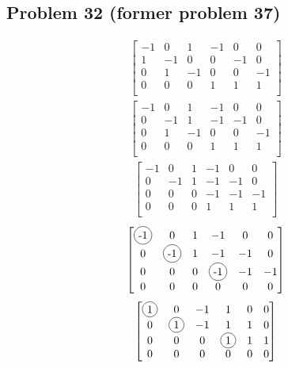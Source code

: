 \documentclass[a4paper,11pt]{article}
\newcommand*\circled[1]{\tikz[baseline=(char.base)]{
             \node[shape=circle,draw,inner sep=2pt] (char) {#1};}}
\begin{document}
\subsection*{Problem 32 (former problem 37)} 
\begin{align}
\begin{bmatrix}
-1 & 0  & 1  & -1 & 0  & 0  \\
1  & -1 & 0  & 0  & -1 & 0  \\
0  & 1  & -1 & 0  & 0  & -1 \\
0  & 0  & 0  & 1  & 1  & 1  \\
\end{bmatrix}
\end{align}
\begin{align}
\begin{bmatrix}
-1 & 0  & 1  & -1 & 0  & 0  \\
0  & -1 & 1  & -1 & -1 & 0  \\
0  & 1  & -1 & 0  & 0  & -1 \\
0  & 0  & 0  & 1  & 1  & 1  \\
\end{bmatrix}
\end{align}
\begin{align}
\begin{bmatrix}
-1 & 0  & 1  & -1 & 0  & 0  \\
0  & -1 & 1  & -1 & -1 & 0  \\
0  & 0  & 0  & -1 & -1 & -1 \\
0  & 0  & 0  & 1  & 1  & 1  \\
\end{bmatrix}
\end{align}
\begin{align}
\begin{bmatrix}
\circled{-1} &           0  & 1  &           -1 &  0 &  0 \\
0            & \circled{-1} & 1  &           -1 & -1 &  0 \\
0            &           0  & 0  & \circled{-1} & -1 & -1 \\
0            &           0  & 0  &            0 &  0 &  0 \\
\end{bmatrix}
\end{align}
\begin{align}
\begin{bmatrix}
\circled{ 1} &           0  & -1  &            1 &  0 &  0 \\
0            & \circled{ 1} & -1  &            1 &  1 &  0 \\
0            &           0  &  0  & \circled{ 1} &  1 &  1 \\
0            &           0  &  0  &            0 &  0 &  0 \\
\end{bmatrix}
\end{align}
\end{document}
